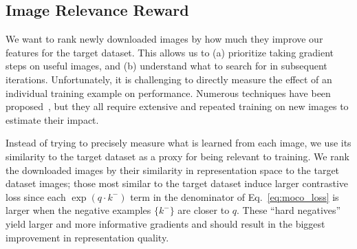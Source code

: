 \subsection{Image Relevance Reward}
\label{subsec:image_rel_reward}
We want to rank newly downloaded images by how much they improve our features for the target dataset. This allows us to (a) prioritize taking gradient steps on useful images, and (b) understand what to search for in subsequent iterations. Unfortunately, it is challenging to directly measure the effect of an individual training example on performance. Numerous techniques have been proposed~\cite{koh2017understanding,feldman2020neural,paul2021deep,ilyas2022datamodels}, but they all require extensive and repeated training on new images to estimate their impact. 

Instead of trying to precisely measure what is learned from each image, we use its similarity to the target dataset as a proxy for being relevant to training.
We rank the downloaded images by their similarity in representation space to the target dataset images; those most similar to the target dataset induce larger contrastive loss since each $\exp(q \cdot k^-)$ term in the denominator of Eq.~\ref{eq:moco_loss} is larger when the negative examples $\{k^-\}$ are closer to $q$.
These ``hard negatives''~\cite{robinson2020contrastive,schroff2015facenet,oh2016deep,harwood2017smart,wu2017sampling,ge2018deep} yield larger and more informative gradients and should result in the biggest improvement in representation quality.
